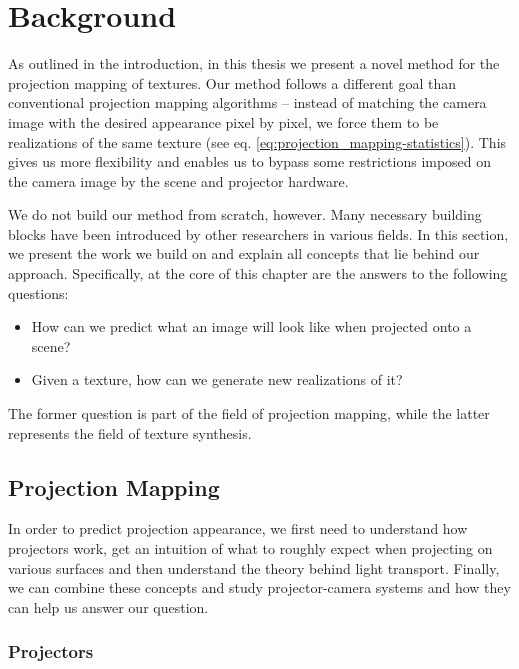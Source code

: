 \chapter{Background}
\label{chapter:background} 

As outlined in the introduction, in this thesis we present a novel method for the projection mapping of textures. Our method follows a different goal than conventional projection mapping algorithms -- instead of matching the camera image with the desired appearance pixel by pixel, we force them to be realizations of the same texture (see eq. \ref{eq:projection_mapping-statistics}). This gives us more flexibility and enables us to bypass some restrictions imposed on the camera image by the scene and projector hardware.

We do not build our method from scratch, however. Many necessary building blocks have been introduced by other researchers in various fields. In this section, we present the work we build on and explain all concepts that lie behind our approach. Specifically, at the core of this chapter are the answers to the following questions:

\begin{itemize}
    \item How can we predict what an image will look like when projected onto a scene?
    \item Given a texture, how can we generate new realizations of it?
\end{itemize}

The former question is part of the field of projection mapping, while the latter represents the field of texture synthesis.

\section{Projection Mapping}
\label{section:background-projection_mapping}

In order to predict projection appearance, we first need to understand how projectors work, get an intuition of what to roughly expect when projecting on various surfaces and then understand the theory behind light transport. Finally, we can combine these concepts and study projector-camera systems and how they can help us answer our question.

\subsection{Projectors}
\label{section:background-projection_mapping-projectors}

